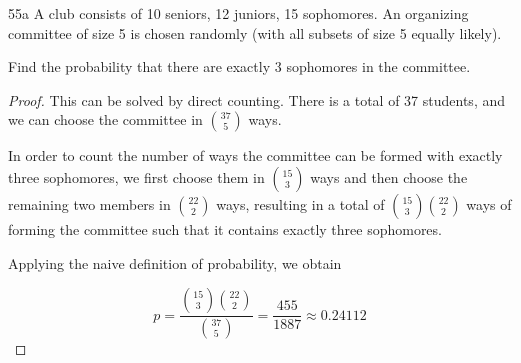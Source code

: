 \begin{exercise}{55a}
    A club consists of 10 seniors, 12 juniors, 15 sophomores. An organizing committee of size 5 is chosen randomly (with all subsets of size 5 equally likely).

    Find the probability that there are exactly 3 sophomores in the committee.
\end{exercise}

\begin{proof}
    This can be solved by direct counting. There is a total of 37 students, and we can choose the committee in $37 \choose 5$ ways.

    In order to count the number of ways the committee can be formed with exactly three sophomores, we first choose them in $15 \choose 3$ ways and then choose the remaining two members in $22 \choose 2$ ways, resulting in a total of ${15 \choose 3}{22 \choose 2}$ ways of forming the committee such that it contains exactly three sophomores.

    Applying the naive definition of probability, we obtain

    $$p = \frac{{15 \choose 3}{22 \choose 2}}{{37 \choose 5}} = \frac{455}{1887} \approx 0.24112$$
\end{proof}

